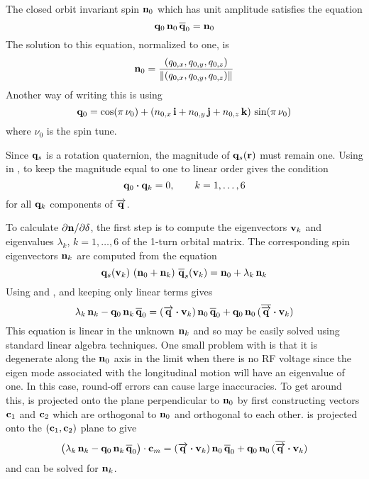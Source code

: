 The closed orbit invariant spin ${\bf n}_0$ which has unit amplitude satisfies the equation
\begin{equation}
  \bfq_0 \, \bfn_0 \, \BAR\bfq_0 = \bfn_0
  \label{qnqn}
\end{equation}
The solution to this equation, normalized to one, is
\begin{equation}
  {\bf n}_0 = \frac{(q_{0,x}, q_{0,y}, q_{0,z})}{\|(q_{0,x}, q_{0,y}, q_{0,z})\|}
  \label{nkqqq}
\end{equation}
Another way of writing this is using 
\begin{equation}
  {\bf q}_0 = \cos(\pi \, \nu_0) + 
  (n_{0,x} \, {\bf i} + n_{0,y} \, {\bf j} + n_{0,z} \, {\bf k}) \, \sin(\pi \, \nu_0)
  \label{qnni}
\end{equation}
where $\nu_0$ is the spin tune.

Since ${\bf q}_s$ is a rotation quaternion, the magnitude of ${\bf q}_s({\bf r})$ must remain one. Using
 in , to keep the magnitude equal to one to linear order gives the condition
\begin{equation}
  {\bf q}_0 \mathbin{\boldsymbol{\cdot}} {\bf q}_k = 0, \qquad k = 1, \ldots, 6
\end{equation}
for all ${\bf q}_k$ components of $\overrightarrow{{\bf q}}$.

To calculate $\partial{\bf n}/\partial\delta$, the first step is to compute the eigenvectors ${\bf v}_k$ and
eigenvalues $\lambda_k$, $k = 1, \ldots, 6$ of the 1-turn orbital matrix. The
corresponding spin eigenvectors ${\bf n}_k$ are computed from the equation
\begin{equation}
  \bfq_s(\bfv_k) \,\, (\bfn_0 + \bfn_k) \,\, \BAR\bfq_s(\bfv_k) = \bfn_0 + \lambda_k \, \bfn_k
  \label{qnnq}
\end{equation}
Using  and , and keeping only linear terms gives
\begin{equation}
  \lambda_k \, \bfn_k - \bfq_0 \, \bfn_k \, \BAR\bfq_0 = 
  (\arrowbfq \dotproduct \bfv_k) \, \bfn_0 \, \BAR\bfq_0 + 
  \bfq_0 \, \bfn_0 \, (\BAR\arrowbfq \dotproduct \bfv_k)
  \label{lnqnq}
\end{equation}
This equation is linear in the unknown ${\bf n}_k$ and so may be easily solved using standard linear
algebra techniques. One small problem with  is that it is degenerate along the ${\bf n}_0$
axis in the limit when there is no RF voltage since the eigen mode associated with the longitudinal
motion will have an eigenvalue of one. In this case, round-off errors can cause large
inaccuracies. To get around this,  is projected onto the plane perpendicular to ${\bf n}_0$
by first constructing vectors ${\bf c}_1$ and ${\bf c}_2$ which are orthogonal to ${\bf n}_0$ and orthogonal
to each other.  is projected onto the $({\bf c}_1, {\bf c}_2)$ plane to give
\begin{align}
  \big( \lambda_k \, \bfn_k - \bfq_0 \, \bfn_k \, \BAR\bfq_0 \big) \cdot \bfc_m = 
  (\arrowbfq \dotproduct \bfv_k) \, \bfn_0 \, \BAR\bfq_0 + 
  \bfq_0 \, \bfn_0 \, (\BAR\arrowbfq \dotproduct \bfv_k)
  \label{lnqnq}
\end{align}
and can be solved for ${\bf n}_k$.


